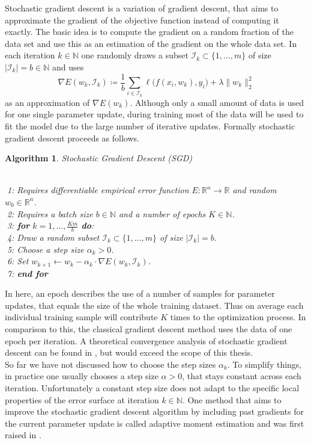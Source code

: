 \documentclass[11pt, a4paper]{article}
\newtheorem{algorithm}[theorem]{Algorithm}
\newcommand{\N}{\mathbb{N}}
\newcommand{\R}{\mathbb{R}}
\newcommand{\I}{\mathcal{I}}
\begin{document}
Stochastic gradient descent is a variation of gradient descent, that aims to approximate the gradient of the objective function instead of computing it exactly. The basic idea is to compute the gradient on a random fraction of the data set and use this as an estimation of the gradient on the whole data set. In each iteration $k \in \N$ one randomly draws a subset $\I_k \subset \{ 1, \dots, m \}$ of size $| \I_k | = b \in \N$ and uses
\[ \nabla E(w_k,\I_k) \coloneq \frac{1}{b} \sum_{i \in \I_k}^{}  \ell \big ( f(x_i,w_k),y_i \big) + \lambda \big \| w_k \big \|_2^2 \]
as an approximation of $\nabla E(w_k)$. Although only a small amount of data is used for one single parameter update, during training most of the data will be used to fit the model due to the large number of iterative updates. Formally stochastic gradient descent proceeds as follows.

\begin{algorithm}
\caption{Stochastic Gradient Descent (SGD)} \ \\
\textcolor{white}{$\Big |$}1: Requires differentiable empirical error function $E: \R^n \to \R$ and random $w_0 \in \R^n$. \\
\textcolor{white}{$\Big |$}2: Requires a batch size $b \in \N$ and a number of epochs $K \in \N$. \\
\textcolor{white}{$\Big |$}3: \textbf{for} $k=1, \dots, \frac{Km}{b}$ \textbf{do}: \\
\textcolor{white}{$\Big |$}4: \quad Draw a random subset $\I_k \subset \{1, \dots, m \}$ of size $| \I_k | = b$. \\
\textcolor{white}{$\Big |$}5: \quad Choose a step size $\alpha_k > 0$. \\
\textcolor{white}{$\Big |$}6: \quad Set $w_{k+1} \leftarrow w_k - \alpha_k \cdot \nabla E(w_k,\I_k)$. \\
\textcolor{white}{$\Big |$}7: \textbf{end for}
\end{algorithm}

In here, an epoch describes the use of a number of samples for parameter updates, that equals the size of the whole training dataset. Thus on average each individual training sample will contribute $K$ times to the optimization process. In comparison to this, the classical gradient descent method uses the data of one epoch per iteration. A theoretical convergence analysis of stochastic gradient descent can be found in \cite{SGD}, but would exceed the scope of this thesis. \\

So far we have not discussed how to choose the step sizes $\alpha_k$. To simplify things, in practice one usually chooses a step size $\alpha > 0$, that stays constant across each iteration. Unfortunately a constant step size does not adapt to the specific local properties of the error surface at iteration $k \in \N$. One method that aims to improve the stochastic gradient descent algorithm by including past gradients for the current parameter update is called adaptive moment estimation and was first raised in \cite{Adam}. \\
\end{document}

